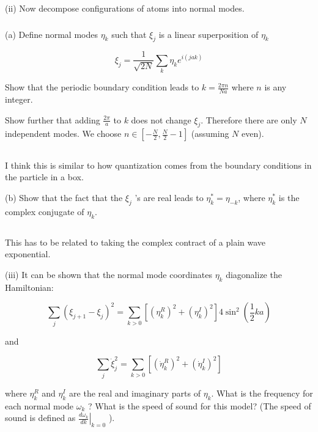 \documentclass[12pt]{article}
\begin{document}
(ii) Now decompose configurations of atoms into normal modes.
\subsubsection{}
(a) Define normal modes $\eta_{k}$ such that $\xi_{j}$ is a linear superposition of $\eta_{k}$

\begin{equation*}
\xi_{j}=\frac{1}{\sqrt{2 N}} \sum_{k} \eta_{k} e^{i(j a k)} \tag{7}
\end{equation*}


Show that the periodic boundary condition leads to $k=\frac{2 \pi n}{N a}$ where $n$ is any integer.

Show further that adding $\frac{2 \pi}{a}$ to $k$ does not change $\xi_{j}$. Therefore there are only $N$ independent modes. We choose $n \in\left[-\frac{N}{2}, \frac{N}{2}-1\right]$ (assuming $N$ even).
\subsection{}
I think this is similar to how quantization comes from the boundary conditions in the particle in a box.

(b) Show that the fact that the $\xi_{j}$ 's are real leads to $\eta_{k}^{*}=\eta_{-k}$, where $\eta_{k}^{*}$ is the complex conjugate of $\eta_{k}$.
\subsection{}
This has to be related to taking the complex contract of a plain wave exponential.

(iii) It can be shown that the normal mode coordinates $\eta_{k}$ diagonalize the Hamiltonian:


\begin{equation*}
\sum_{j}\left(\xi_{j+1}-\xi_{j}\right)^{2}=\sum_{k>0}\left[\left(\eta_{k}^{R}\right)^{2}+\left(\eta_{k}^{I}\right)^{2}\right] 4 \sin ^{2}\left(\frac{1}{2} k a\right) \tag{8}
\end{equation*}


and


\begin{equation*}
\sum_{j} \dot{\xi}_{j}^{2}=\sum_{k>0}\left[\left(\dot{\eta}_{k}^{R}\right)^{2}+\left(\dot{\eta}_{k}^{I}\right)^{2}\right] \tag{9}
\end{equation*}


where $\eta_{k}^{R}$ and $\eta_{k}^{I}$ are the real and imaginary parts of $\eta_{k}$. What is the frequency for each normal mode $\omega_{k}$ ? What is the speed of sound for this model? (The speed of sound is defined as $\left.\frac{d \omega_{k}}{d k}\right|_{k=0}$ ).
\end{document}
